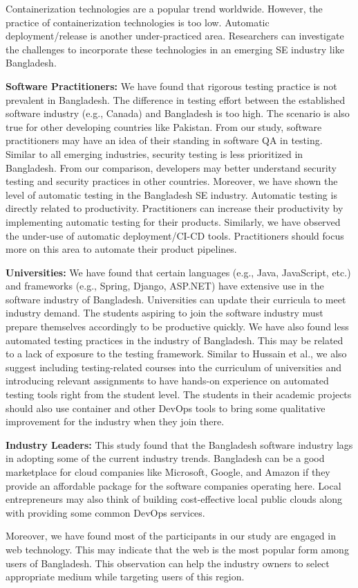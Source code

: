 Containerization technologies are a popular trend worldwide. However, the practice of containerization technologies is too low. Automatic deployment/release is another under-practiced area. Researchers can investigate the challenges to incorporate these technologies in an emerging SE industry like Bangladesh.

\indent \textbf{Software Practitioners:} We have found that rigorous testing practice is not prevalent in Bangladesh. The difference in testing effort between the established software industry (e.g., Canada) and Bangladesh is too high. The scenario is also true for other developing countries like Pakistan. From our study, software practitioners may have an idea of their standing in software QA in testing. Similar to all emerging industries, security testing is less prioritized in Bangladesh. From our comparison, developers may better understand security testing and security practices in other countries. Moreover, we have shown the level of automatic testing in the Bangladesh SE industry. Automatic testing is directly related to productivity. Practitioners can increase their productivity by implementing automatic testing for their products. Similarly, we have observed the under-use of automatic deployment/CI-CD tools. Practitioners should focus more on this area to automate their product pipelines.

\indent \textbf{Universities:} We have found that certain languages (e.g., Java, JavaScript, etc.) and frameworks (e.g., Spring, Django, ASP.NET) have extensive use in the software industry of Bangladesh. Universities can update their curricula to meet industry demand. The students aspiring to join the software industry must prepare themselves accordingly to be productive quickly. We have also found less automated testing practices in the industry of Bangladesh. This may be related to a lack of exposure to the testing framework. Similar to Hussain et al.\cite{Hussain2020}, we also suggest including testing-related courses into the curriculum of universities and introducing relevant assignments to have hands-on experience on automated testing tools right from the student level. The students in their academic projects should also use container and other DevOps tools to bring some qualitative improvement for the industry when they join there.


\indent \textbf{Industry Leaders:} This study found that the Bangladesh software industry lags in adopting some of the current industry trends. Bangladesh can be a good marketplace for cloud companies like Microsoft, Google, and Amazon if they provide an affordable package for the software companies operating here. Local entrepreneurs may also think of building cost-effective local public clouds along with providing some common DevOps services.  

Moreover, we have found most of the participants in our study are engaged in web technology. This may indicate that the web is the most popular form among users of Bangladesh. This observation can help the industry owners to select appropriate medium while targeting users of this region. %
